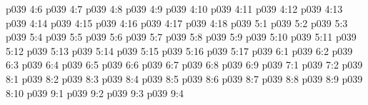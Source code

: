 \vs p039 4:6 
\vs p039 4:7 
\vs p039 4:8 
\vs p039 4:9 
\vs p039 4:10 
\vs p039 4:11 
\vs p039 4:12 \pc 
\vs p039 4:13 
\vs p039 4:14 
\vs p039 4:15 
\vs p039 4:16 
\vs p039 4:17 
\vs p039 4:18 
\vs p039 5:1 
\vs p039 5:2 
\vs p039 5:3 
\vs p039 5:4 
\vs p039 5:5 
\vs p039 5:6 
\vs p039 5:7 
\vs p039 5:8 
\vs p039 5:9 
\vs p039 5:10 
\vs p039 5:11 \pc 
\vs p039 5:12 
\vs p039 5:13 \pc 
\vs p039 5:14 
\vs p039 5:15 \pc 
\vs p039 5:16 
\vs p039 5:17 
\vs p039 6:1 
\vs p039 6:2 
\vs p039 6:3 
\vs p039 6:4 
\vs p039 6:5 
\vs p039 6:6 
\vs p039 6:7 
\vs p039 6:8 
\vs p039 6:9 \pc 
{}
\vs p039 7:1 
\vs p039 7:2 
\vs p039 8:1 
\vs p039 8:2 \pc 
\vs p039 8:3 
\vs p039 8:4 
\vs p039 8:5 
\vs p039 8:6 
\vs p039 8:7 \pc 
\vs p039 8:8 
\vs p039 8:9 \pc 
\vs p039 8:10 
\vs p039 9:1 
\vs p039 9:2 
\vs p039 9:3 
\vsetoff
\vs p039 9:4 
\quizlink
